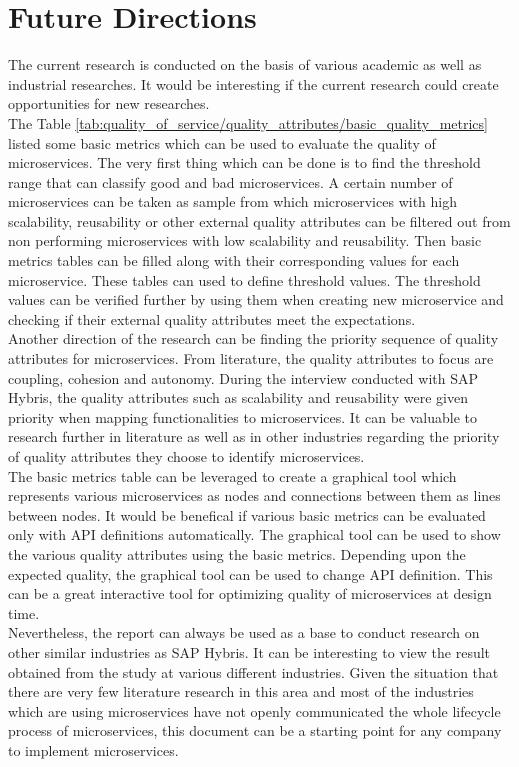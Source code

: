 \chapter{Future Directions}\label{chapter:future_directions}
The current research is conducted on the basis of various academic as well as industrial researches. It would be interesting if the current research could create opportunities for new researches.\\
The Table \ref {tab:quality_of_service/quality_attributes/basic_quality_metrics} listed some basic metrics which can be used to evaluate the quality of microservices. The very first thing which can be done is to find the threshold range that can classify good and bad microservices. A certain number of microservices can be taken as sample from which microservices with high scalability, reusability or other external quality attributes can be filtered out from non performing microservices with low scalability and reusability. Then basic metrics tables can be filled along with their corresponding values for each microservice. These tables can used to define threshold values. The threshold values can be verified further by using them when creating new microservice and checking if their external quality attributes meet the expectations.\\
Another direction of the research can be finding the priority sequence of quality attributes for microservices. From literature, the quality attributes to focus are coupling, cohesion and autonomy. During the interview conducted with SAP Hybris, the quality attributes such as scalability and reusability were given priority when mapping functionalities to microservices. It can be valuable to research further in literature as well as in other industries regarding the priority of quality attributes they choose to identify microservices.\\
The basic metrics table can be leveraged to create a graphical tool which represents various microservices as nodes and connections between them as lines between nodes. It would be benefical if various basic metrics can be evaluated only with \acrshort{API} definitions automatically. The graphical tool can be used to show the various quality attributes using the basic metrics. Depending upon the expected quality, the graphical tool can be used to change \acrshort{API} definition. This can be a great interactive tool for optimizing quality of microservices at design time.\\
Nevertheless, the report can always be used as a base to conduct research on other similar industries as SAP Hybris. It can be interesting to view the result obtained from the study at various different industries. Given the situation that there are very few literature research in this area and most of the industries which are using microservices have not openly communicated the whole lifecycle process of microservices, this document can be a starting point for any company to implement microservices.
